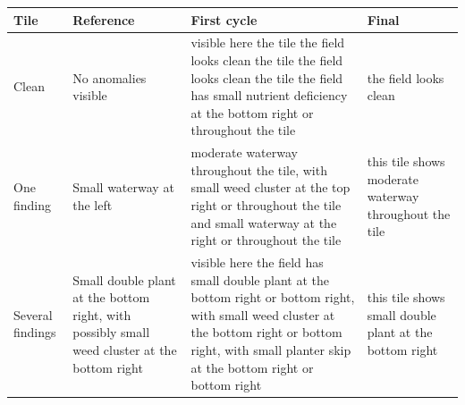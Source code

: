 \begin{tabular}{lp{}p{}p{}}
\toprule
Tile & Reference & First cycle & Final \\
\midrule
Clean & No anomalies visible & visible here the tile the field looks clean the tile the field looks clean the tile the field has small nutrient deficiency at the bottom right or throughout the tile & the field looks clean \\
One finding & Small waterway at the left & moderate waterway throughout the tile, with small weed cluster at the top right or throughout the tile and small waterway at the right or throughout the tile & this tile shows moderate waterway throughout the tile \\
Several findings & Small double plant at the bottom right, with possibly small weed cluster at the bottom right & visible here the field has small double plant at the bottom right or bottom right, with small weed cluster at the bottom right or bottom right, with small planter skip at the bottom right or bottom right & this tile shows small double plant at the bottom right \\
\bottomrule
\end{tabular}
